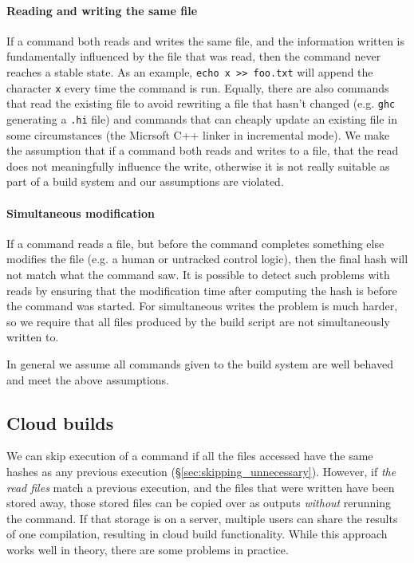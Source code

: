 \paragraph{Reading and writing the same file} If a command both reads and writes the same file, and the information written is fundamentally influenced by the file that was read, then the command never reaches a stable state. As an example, \verb"echo x >> foo.txt" will append the character \texttt{x} every time the command is run. Equally, there are also commands that read the existing file to avoid rewriting a file that hasn't changed (e.g. \texttt{ghc} generating a \texttt{.hi} file) and commands that can cheaply update an existing file in some circumstances (the Micrsoft C++ linker in incremental mode). We make the assumption that if a command both reads and writes to a file, that the read does not meaningfully influence the write, otherwise it is not really suitable as part of a build system and our assumptions are violated.

\paragraph{Simultaneous modification} If a command reads a file, but before the command completes something else modifies the file (e.g. a human or untracked control logic), then the final hash will not match what the command saw. It is possible to detect such problems with reads by ensuring that the modification time after computing the hash is before the command was started. For simultaneous writes the problem is much harder, so we require that all files produced by the build script are not simultaneously written to.

\postparagraphs In general we assume all commands given to the build system are well behaved and meet the above assumptions.

\subsection{Cloud builds}
\label{sec:cloud_builds}

We can skip execution of a command if all the files accessed have the same hashes as any previous execution (\S\ref{sec:skipping_unnecessary}). However, if \emph{the read files} match a previous execution, and the files that were written have been stored away, those stored files can be copied over as outputs \emph{without} rerunning the command. If that storage is on a server, multiple users can share the results of one compilation, resulting in cloud build functionality. While this approach works well in theory, there are some problems in practice.

